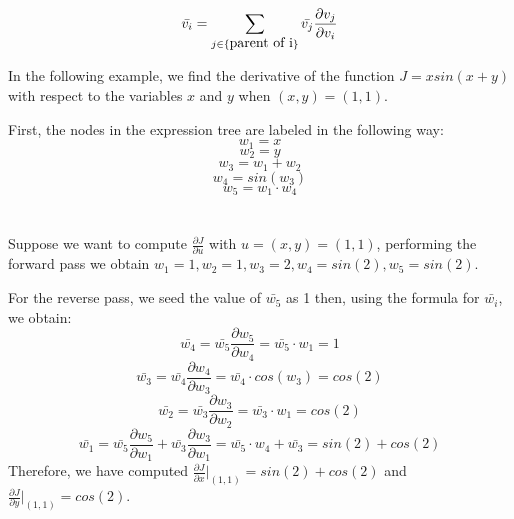 \documentclass{article}
\begin{document}
\begin{equation}
\Bar{v_i} = \sum_{j\in\{\mbox{parent of i}\}} \Bar{v_j}\frac{\partial{v_j}}{\partial{v_i}}
\end{equation}

In the following example, we find the derivative of the function $J = xsin(x+y)$ with respect to the variables $x$ and $y$ when $(x, y) = (1, 1)$.

First, the nodes in the expression tree are labeled in the following way:
\begin{equation}
w_1 = x
\end{equation}
\begin{equation}
w_2 = y
\end{equation}
\begin{equation}
w_3 = w_1 + w_2
\end{equation}
\begin{equation}
w_4 = sin(w_3)
\end{equation}
\begin{equation}
w_5 = w_1 \cdot w_4
\end{equation}
\\\\

Suppose we want to compute $\frac{\partial{J}}{\partial{u}}$ with $u = (x, y) = (1, 1)$, performing the forward pass we obtain $w_1 = 1, w_2 = 1, w_3 = 2, w_4 = sin(2), w_5 = sin(2)$.

For the reverse pass, we seed the value of $\bar{w_5}$ as 1 then, using the formula for $\bar{w_i}$, we obtain:
\begin{equation}
\bar{w_4} = \bar{w_5}\frac{\partial{w_5}}{\partial{w_4}} = \bar{w_5}\cdot w_1 = 1
\end{equation}
\begin{equation}
\bar{w_3} = \bar{w_4}\frac{\partial{w_4}}{\partial{w_3}} = \bar{w_4}\cdot cos(w_3) = cos(2)
\end{equation}
\begin{equation}
\bar{w_2} = \bar{w_3}\frac{\partial{w_3}}{\partial{w_2}} = \bar{w_3}\cdot w_1 = cos(2)
\end{equation}
\begin{equation}
\bar{w_1} = \bar{w_5}\frac{\partial{w_5}}{\partial{w_1}} + \bar{w_3}\frac{\partial{w_3}}{\partial{w_1}} = \bar{w_5}\cdot w_4 + \bar{w_3} = sin(2) + cos(2)
\end{equation}
Therefore, we have computed $\frac{\partial{J}}{\partial{x}}\vert_{(1, 1)} = sin(2) + cos(2)$ and $\frac{\partial{J}}{\partial{y}}\vert_{(1, 1)} = cos(2)$.
\end{document}

